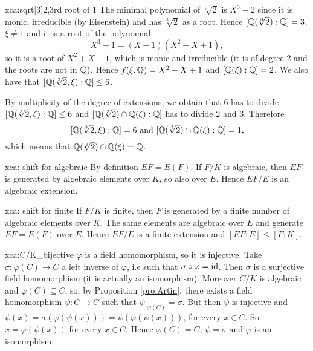\begin{sol}{xca:sqrt[3]2,3rd root of 1}
The minimal polynomial of $\sqrt[3]{2}$ is $X^3-2$
since it is monic, irreducible (by Eisenstein) and has $\sqrt[3]{2}$
as a root. Hence $[\mathbb{Q}(\sqrt[3]{2}):\mathbb{Q}]=3$.
$\xi\neq 1$ and it is a root of the polynomial 
\[
X^3-1=(X-1)(X^2+X+1),
\]
so it is a root of $X^2+X+1$, which is monic and
irreducible (it is of degree 2 and the roots are not in $\mathbb{Q})$.
Hence $f(\xi,\mathbb{Q})=X^2+X+1$ and $[\mathbb{Q}(\xi):\mathbb{Q}]=2$.
We also have that $[\mathbb{Q}(\sqrt[3]{2},\xi):\mathbb{Q}]\leq 6$.
    \begin{center}
    \end{center}
By multiplicity of the degree of extensions, we obtain that
6 has to divide $[\mathbb{Q}(\sqrt[3]{2},\xi):\mathbb{Q}]\leq 6$ and
$[\mathbb{Q}(\sqrt[3]{2})\cap\mathbb{Q}(\xi):\mathbb{Q}]$ has to divide 2 and 3.
Therefore 
\[
[\mathbb{Q}(\sqrt[3]{2},\xi):\mathbb{Q}]=6 \text{ and }
[\mathbb{Q}(\sqrt[3]{2})\cap\mathbb{Q}(\xi):\mathbb{Q}]=1,
\]
which means that
$\mathbb{Q}(\sqrt[3]{2})\cap\mathbb{Q}(\xi)=\mathbb{Q}$.
\end{sol}

\begin{sol}{xca: shift for algebraic}
By definition $EF=E(F)$. If $F/K$ is algebraic, then $EF$ is
generated by algebraic elements over $K$, so also over $E$.
Hence $EF/E$ is an algebraic extension.
\end{sol}

\begin{sol}{xca: shift for finite}
If $F/K$ is finite,
then $F$ is generated by a finite number of algebraic elements over $K$.
The same elements are algebraic over $E$ and generate $EF=E(F)$ over $E$.
Hence $EF/E$ is a finite extension and $[EF:E]\leq [F:K]$.
\end{sol}

\begin{sol}{xca:C/K_bijective}
$\varphi$ is a field homomorphism,
so it is injective.
Take $\sigma:\varphi(C)\to C$ a left inverse
of $\varphi$, i.e such that $\sigma\circ\varphi=\operatorname{id}$.
Then $\sigma$ is a surjective field homomorphism (it is actually an isomorphism).
Moreover $C/K$ is algebraic and $\varphi(C)\subseteq C$,
so, by Proposition \ref{pro:Artin}, there exists 
a field homomorphism $\psi: C\to C$
such that $\psi|_{\varphi(C)}=\sigma$.
But then $\psi$ is injective and 
$\psi(x)=\sigma(\varphi(\psi(x)))=\psi(\varphi(\psi(x)))$, for every $x\in C$.
So $x=\varphi(\psi(x))$ for every $x\in C$.
Hence $\varphi(C)=C$, $\psi=\sigma$ and $\varphi$ is an isomorphism.
\end{sol}


